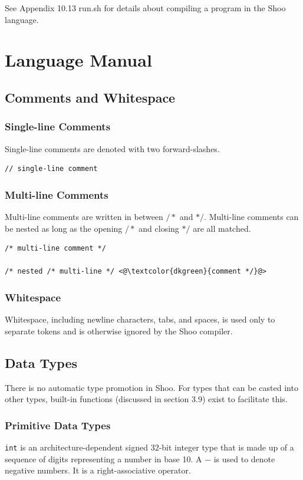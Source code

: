 \documentclass[12pt]{article}
\begin{document}
See Appendix 10.13 run.sh for details about compiling a program in the Shoo language.

\section{Language Manual}
\subsection{Comments and Whitespace}
\subsubsection{Single-line Comments}
Single-line comments are denoted with two forward-slashes. 
\begin{lstlisting}
// single-line comment
\end{lstlisting}

\subsubsection{Multi-line Comments}
Multi-line comments are written in between $/*$ and $*/$. Multi-line comments can be nested as long as the opening $/*$ and closing $*/$ are all matched.
\begin{lstlisting}
/* multi-line comment */

/* nested /* multi-line */ <@\textcolor{dkgreen}{comment */}@>
\end{lstlisting}

\subsubsection{Whitespace}
Whitespace, including newline characters, tabs, and spaces, is used only to separate tokens and is otherwise ignored by the Shoo compiler. 

\subsection{Data Types}

There is no automatic type promotion in Shoo. For types that can be casted into other types, built-in functions (discussed in section 3.9) exist to facilitate this.

\subsubsection{Primitive Data Types}
\lstinline!int! is an architecture-dependent signed 32-bit integer type that is made up of a sequence of digits representing a number in base 10. A $-$ is used to denote negative numbers. It is a right-associative operator.
\end{document}
